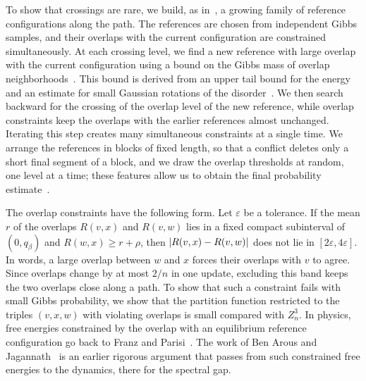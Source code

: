 To show that crossings are rare, we build, as in~\cite{oai-barriers}, a
growing family of reference configurations along the path. The references
are chosen from independent Gibbs samples, and their overlaps with the
current configuration are constrained simultaneously. At each crossing
level, we find a new reference with large overlap with the current configuration
using a bound on the Gibbs mass of overlap
neighborhoods~\cite[Proposition~6.1]{oai-barriers}. This bound is derived
from an upper tail bound for the energy and an estimate for small Gaussian
rotations of the disorder~\cite[Lemmas~5.1 and~5.2]{oai-barriers}. We
then search backward for the crossing of the overlap level of the new
reference, while overlap constraints keep the overlaps with the earlier
references almost unchanged. Iterating this step creates many simultaneous
constraints at a single time. We arrange the references in blocks of fixed
length, so that a conflict deletes only a short final segment of a block, and
we draw the overlap thresholds at random, one level at a time; these features
allow us to obtain the final
probability estimate~\cite[Sections~8.3--8.5]{oai-barriers}.

The overlap constraints have the following form. Let $\varepsilon$ be a
tolerance. If the mean $r$ of the overlaps $R(v,x)$ and $R(v,w)$ lies in a
fixed compact subinterval of $(0,q_\beta)$ and $R(w,x)\ge r+\rho$, then
$\lvert R(v,x)-R(v,w)\rvert$ does not lie in $[2\varepsilon,4\varepsilon]$. In words, a large overlap between $w$ and $x$
forces their overlaps with $v$ to agree. Since overlaps change by at most
$2/n$ in one update, excluding this band keeps the two overlaps close along
a path. To show that such a constraint fails with small Gibbs probability, we show
that the partition function restricted to the triples $(v,x,w)$ with
violating overlaps is small compared with $Z_n^3$. In physics, free energies constrained by the overlap
with an equilibrium reference configuration go back to Franz and
Parisi~\cite{franz-parisi-1995}. The work of Ben Arous and
Jagannath~\cite{ben-arous-jagannath-2018} is an earlier rigorous argument
that passes from such constrained free energies to the dynamics, there for
the spectral gap.


